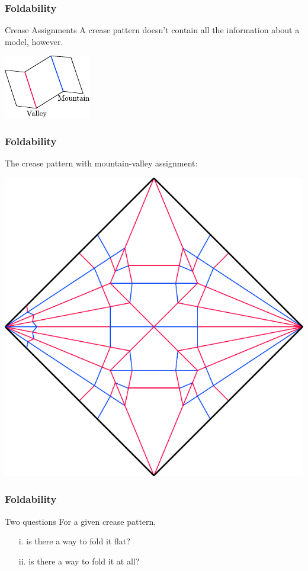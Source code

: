 \documentclass{beamer}
\begin{document}
\begin{frame}
\frametitle{Foldability}
\begin{block}{Crease Assignments}
A crease pattern doesn't contain all the information about a model, however. 
\end{block}
\begin{center}
\includegraphics[width=.5\textwidth]{foldability_pix/mountain-valley.pdf}
\end{center}
\end{frame}

\begin{frame}
\frametitle{Foldability}
\begin{block}{}
The crease pattern with mountain-valley assignment: 
\end{block}
\begin{center}
\includegraphics[width=.5\textwidth]{foldability_pix/crane-assigned.pdf}
\end{center}
\end{frame}

\begin{frame}
\frametitle{Foldability}
\begin{block}{Two questions}
For a given crease pattern,
\begin{enumerate}
\item[i.]
is there a way to fold it flat?
\item[ii.]
is there a way to fold it at all?
\end{enumerate}
\end{block}
\end{frame}
\end{document}
